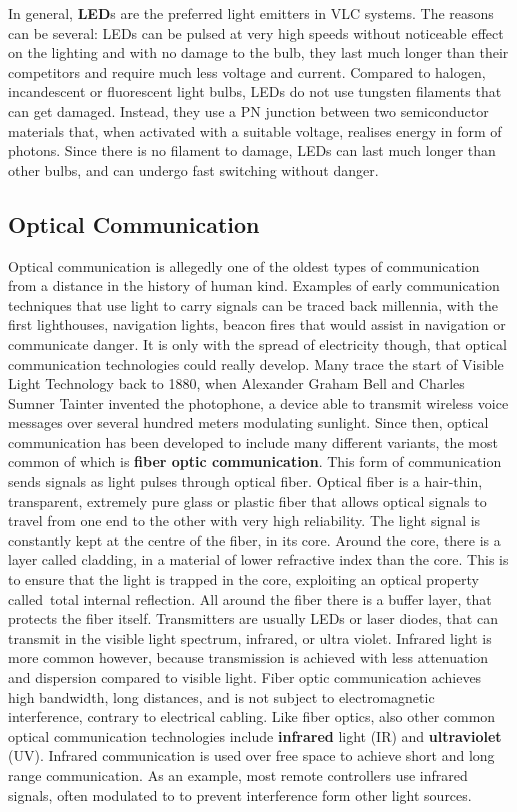 \newline 
In general, \textbf{LED}s are the preferred light emitters in VLC systems.
The reasons can be several: LEDs can be pulsed at very high speeds without noticeable effect on the lighting and with no damage to the bulb, they last much longer than their competitors and require much less voltage and current.
Compared to halogen, incandescent or fluorescent light bulbs, LEDs do not use tungsten filaments that can get damaged.
Instead, they use a PN junction between two semiconductor materials that, when activated with a suitable voltage, realises energy in form of photons.
Since there is no filament to damage, LEDs can last much longer than other bulbs, and can undergo fast switching without danger.
 
\subsection{Optical Communication}
Optical communication is allegedly one of the oldest types of communication from a distance in the history of human kind.
Examples of early communication techniques that use light to carry signals can be traced back millennia, with the first lighthouses, navigation lights, beacon fires that would assist in navigation or communicate danger.
It is only with the spread of electricity though, that optical communication technologies could really develop.
Many trace the start of Visible Light Technology back to 1880, when Alexander Graham Bell and Charles Sumner Tainter invented the photophone, a device able to transmit wireless voice messages over several hundred meters modulating sunlight. 
Since then, optical communication has been developed to include many different variants, the most common of which is \textbf{fiber optic communication}. 
This form of communication sends signals as light pulses through optical fiber.
Optical fiber is a hair-thin, transparent, extremely pure glass or plastic fiber that allows optical signals to travel from one end to the other with very high reliability\cite{opticalfiber}.
The light signal is constantly kept at the centre of the fiber, in its core.
Around the core, there is a layer called cladding, in a material of lower refractive index than the core.
This is to ensure that the light is trapped in the core, exploiting an optical property called total internal reflection.
All around the fiber there is a buffer layer, that protects the fiber itself.
Transmitters are usually LEDs or laser diodes, that can transmit in the visible light spectrum, infrared, or ultra violet.
Infrared light is more common however, because transmission is achieved with less attenuation and dispersion compared to visible light.
Fiber optic communication achieves high bandwidth, long distances, and is not subject to electromagnetic interference, contrary to electrical cabling.
Like fiber optics, also other common optical communication technologies include \textbf{infrared} light (IR) and \textbf{ultraviolet} (UV).
Infrared communication is used over free space to achieve short and long range communication.
As an example, most remote controllers use infrared signals, often modulated to to prevent interference form other light sources.
 
